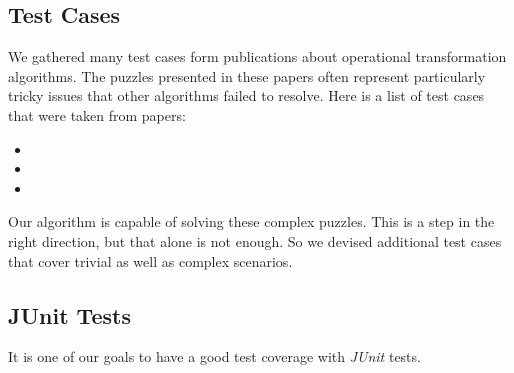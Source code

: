 \subsection{Test Cases}
We gathered many test cases form publications about operational transformation algorithms. The puzzles presented in these papers often represent particularly tricky issues that other algorithms failed to resolve. Here is a list of test cases that were taken from papers:

\begin{itemize}
 \item 
 \item 
 \item 
\end{itemize}

Our algorithm is capable of solving these complex puzzles. This is a step in the right direction, but that alone is not enough. So we devised additional test cases that cover trivial as well as complex scenarios.

\subsection{JUnit Tests}
It is one of our goals to have a good test coverage with \emph{JUnit} tests.
